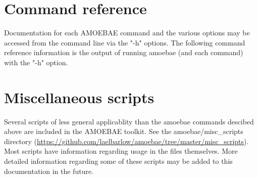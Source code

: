 \documentclass[12pt,letterpaper]{article}
\begin{document}
\begin{linenumbers}
\begin{enumerate}

\end{enumerate}

\section{Command reference}

Documentation for each AMOEBAE command and the various options may be accessed
from the command line via the "-h" options. The following command reference
information is the output of running amoebae (and each command) with the "-h"
option.




\section{Miscellaneous scripts}

Several scripts of less general applicablity than the amoebae commands descibed
above are included in the AMOEBAE toolkit. See the amoebae/misc\_scripts
directory
(\url{https://github.com/laelbarlow/amoebae/tree/master/misc_scripts}). Most
scripts have information regarding usage in the files themselves. More detailed
information regarding some of these scripts may be added to this documentation
in the future.



\printglossaries %

\newpage
\end{linenumbers}

 
\begin{multicols}{2}
{\footnotesize %
}
\end{multicols}
\end{document}
